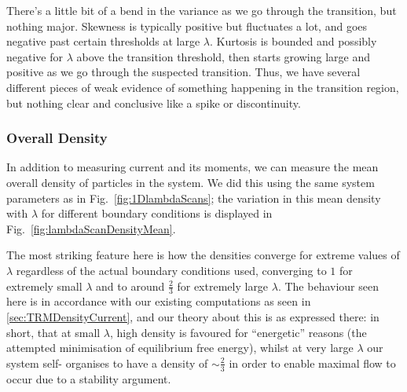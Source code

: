 There's a little bit of a bend in the variance as we go through the transition, but nothing major.
Skewness is typically positive but fluctuates a lot, and goes negative past certain thresholds at
large $\lambda$. Kurtosis is bounded and possibly negative for $\lambda$ above the transition threshold,
then starts growing large and positive as we go through the suspected transition.
Thus, we have several different pieces of weak evidence of something happening in the transition region,
but nothing clear and conclusive like a spike or discontinuity.


\subsubsection{Overall Density}

In addition to measuring current and its moments, we can measure the mean overall density of particles in
the system. We did this using the same system parameters as in Fig.~\ref{fig:1DlambdaScans}; the 
variation in this mean density with $\lambda$ for different boundary conditions is displayed in 
Fig.~\ref{fig:lambdaScanDensityMean}.

The most striking feature here is how the densities converge for extreme values of $\lambda$
regardless of the actual boundary conditions used, converging to $1$ for extremely small $\lambda$ and to
around $\frac{2}{3}$ for extremely large $\lambda$. The behaviour seen here is in accordance with our 
existing computations as seen in \ref{sec:TRMDensityCurrent}, and our theory about this is as expressed 
there: in short, that at small $\lambda$, high density is favoured for ``energetic'' reasons (the
attempted minimisation of equilibrium  free energy), whilst at very large $\lambda$  our system self-
organises to have a density of $\sim \frac{2}{3}$ in order to enable maximal flow to occur due to a
stability argument.

